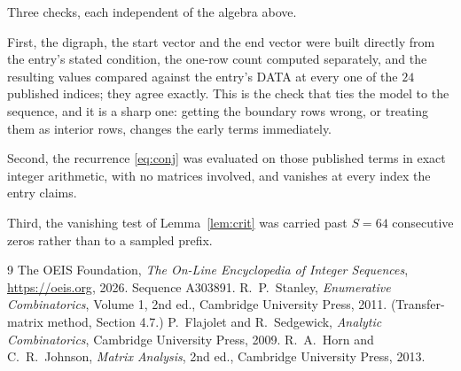 \documentclass[11pt,a4paper]{article}
\theoremstyle{plain}
\theoremstyle{definition}
\begin{document}
Three checks, each independent of the algebra above.

First, the digraph, the start vector and the end vector were built directly from the
entry's stated condition, the one-row count computed separately, and the resulting values
compared against the entry's DATA at every one of the $24$ published indices; they
agree exactly. This is the check that ties the model to the sequence, and it is a sharp one:
getting the boundary rows wrong, or treating them as interior rows, changes the early terms
immediately.

Second, the recurrence \eqref{eq:conj} was evaluated on those published terms in exact
integer arithmetic, with no matrices involved, and vanishes at every index the entry claims.

Third, the vanishing test of Lemma~\ref{lem:crit} was carried past $S=64$ consecutive
zeros rather than to a sampled prefix.

\begin{thebibliography}{9}
 The OEIS Foundation, \emph{The On-Line Encyclopedia of Integer
Sequences}, \url{https://oeis.org}, 2026. Sequence A303891.
 R.~P.~Stanley, \emph{Enumerative Combinatorics}, Volume 1, 2nd ed.,
Cambridge University Press, 2011. (Transfer-matrix method, Section 4.7.)
 P.~Flajolet and R.~Sedgewick, \emph{Analytic Combinatorics}, Cambridge
University Press, 2009.
 R.~A.~Horn and C.~R.~Johnson, \emph{Matrix Analysis}, 2nd ed., Cambridge
University Press, 2013.
\end{thebibliography}
\end{document}
